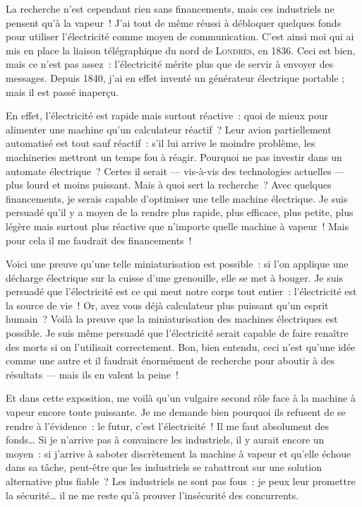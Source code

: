 {La recherche n’est cependant rien sans financements, mais ces industriels ne pensent qu’à la vapeur~!
J’ai tout de même réussi à débloquer quelques fonds pour utiliser l’électricité comme moyen de communication.
C’est ainsi moi qui ai mis en place la liaison télégraphique du nord de \textsc{Londres}, en 1836.
Ceci est bien, mais ce n’est pas assez~:  l’électricité mérite plus que de servir à envoyer des messages.
Depuis 1840, j’ai en effet inventé un générateur électrique portable ; mais il est passé inaperçu.

En effet, l’électricité est rapide mais surtout réactive~:  quoi de mieux pour alimenter une machine qu’un calculateur réactif~?
Leur avion partiellement automatisé est tout sauf réactif~:  s’il lui arrive le moindre problème, les machineries mettront un temps fou à réagir.
Pourquoi ne pas investir dans un automate électrique~?  Certes il serait — vis-à-vis des technologies actuelles — plus lourd et moins puissant.
Mais à quoi sert la recherche~?  Avec quelques financements, je serais capable d’optimiser une telle machine électrique.
Je suis persuadé qu’il y a moyen de la rendre plus rapide, plus efficace, plus petite, plus légère mais surtout plus réactive que n’importe quelle machine à vapeur~!
Mais pour cela il me faudrait des financements~!

Voici une preuve qu’une telle miniaturisation est possible~:  si l’on applique une décharge électrique sur la cuisse d’une grenouille, elle se met à bouger.
Je suis persuadé que l’électricité est ce qui meut notre corps tout entier~:  l’électricité est la source de vie~!
Or, avez vous déjà calculateur plus puissant qu’un esprit humain~?
Voilà la preuve que la miniaturisation des machines électriques est possible.
Je suis même persuadé que l’électricité serait capable de faire renaître des morts si on l’utilisait correctement.
Bon, bien entendu, ceci n’est qu’une idée comme une autre et il faudrait énormément de recherche pour aboutir à des résultats — mais ils en valent la peine~!

Et dans cette exposition, me voilà qu’un vulgaire second rôle face à la machine à vapeur encore toute puissante.
Je me demande bien pourquoi ils refusent de se rendre à l’évidence~:  le futur, c’est l’électricité~!
Il me faut absolument des fonds…
Si je n’arrive pas à convaincre les industriels, il y aurait encore un moyen~:  si j’arrive à saboter discrètement la machine à vapeur et qu’elle échoue dans sa tâche, peut-être que les industriels se rabattront sur une solution alternative plus fiable~?
Les industriels ne sont pas fous~:  je peux leur promettre la sécurité… il ne me reste qu’à prouver l’insécurité des concurrents.
}

